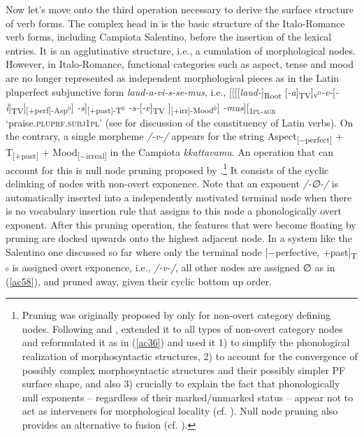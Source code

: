 \documentclass[output=paper]{langscibook}
\begin{document}
Now let's move onto the third operation necessary to derive the surface structure of verb forms. The complex head in   is the basic structure of the Italo-Romance verb forms, including Campiota Salentino, before the insertion of the lexical entries. It is an agglutinative structure, i.e., a cumulation of morphological nodes. However, in Italo-Romance, functional categories such as aspect, tense and mood are no longer represented as independent morphological pieces as in the Latin pluperfect subjunctive form \textit{laud-a-vi-s-se-mus}, i.e., [[[[\textit{laud-}]\textsubscript{Root} [\textit{-a}]\textsubscript{TV}]\textsubscript{v$^0$}\textit{-v-}[\textit{-i}]\textsubscript{TV}]\textsubscript{[+perf]-Asp$^0$}] \textit{-s}]\textsubscript{[+past]-T$^0$} \textit{-s-}[\textit{-e}]\textsubscript{TV} ]\textsubscript{[+irr]-Mood$^0$}] \textit{-mus}][\textsubscript{\textsc{1pl-agr}}  ‘praise.\textsc{plu\-prf}.\textsc{subj}\-\textsc{1pl}’ (see \citealt{calabrese2020} for discussion of the constituency of Latin verbs). On the contrary, a single morpheme \textit{/-v-/} appears for the string Aspect\textsubscript{[−perfect]} + T\textsubscript{[+past]} + Mood\textsubscript{[−irreal]} in the Campiota \textit{kkattavamu}.  An operation that can account for this is null node pruning proposed by \citet{calabrese2019a}.\footnote{Pruning was originally proposed by \citet{embick2010a} only for non-overt category defining nodes. Following \citet{christopoulos2017a} and \citet{christopoulos2018a}, \citet{calabrese2019a} extended it to all types of non-overt category nodes and reformulated it as in (\ref{ac36}) and used it 1) to simplify the phonological realization of morphosyntactic structures, 2) to account for the convergence of possibly complex morphosyntactic structures and their possibly simpler PF surface shape, and also 3) crucially to explain the fact that phonologically null exponents -- regardless of their marked/unmarked status --  appear not to act as interveners for morphological locality (cf. \citealt{embick2010a, calabrese2019a}). Null node pruning also provides an alternative to fusion (cf. \citealt{halle1993a}).}
It consists of the cyclic delinking of nodes with non-overt exponence. Note that an exponent \textit{/-∅-/} is automatically  inserted  into a independently motivated  terminal node when there is no vocabulary insertion rule that assigns to this node a phonologically overt exponent.  After this pruning operation, the features that were become floating by pruning are docked upwards onto the highest adjacent node.  In a system like the Salentino one discussed so far where only the terminal node [−perfective, +past]\textsubscript{T$^0$} is assigned overt exponence, i.e., \textit{/-v-/}, all other nodes are assigned ∅ as in (\ref{ac58}), and pruned away, given their cyclic bottom up order.
\end{document}

